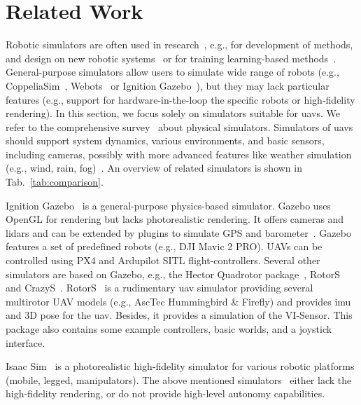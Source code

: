 \section{Related Work}
Robotic simulators are often used in research~\cite{collinsAReview2021}, e.g., for development of methods, and design on new robotic systems~\cite{kriegmanScalablePipelineDesigning2020} or for training learning-based methods~\cite{peng2017deeploco,miki2022learning}.
  General-purpose simulators allow users to simulate wide range of robots (e.g., CoppeliaSim~\cite{coppeliaSim}, Webots~\cite{Webots} or Ignition Gazebo~\cite{koenigDesignUseParadigms2004,gazeboNew}), but they may lack particular features (e.g., support for hardware-in-the-loop the specific robots or high-fidelity rendering).
  In this section, we focus solely on simulators suitable for \acp{uav}.
  We refer to the comprehensive survey~\cite{collinsAReview2021} about physical simulators.
  Simulators of \acp{uav} should support system dynamics, various environments, and basic sensors, including cameras, possibly with more advanced features like weather simulation (e.g., wind, rain, fog)~\cite{dimmig2024survey,Silano2023SurveySimulator}.
  An overview of related simulators is shown in Tab.~\ref{tab:comparison}.

  Ignition Gazebo~\cite{koenigDesignUseParadigms2004,gazeboNew} is a general-purpose physics-based simulator.
  Gazebo uses OpenGL for rendering but lacks photorealistic rendering.
  It offers cameras and \acp{lidar} and can be extended by plugins to simulate GPS and barometer~\cite{meyerComprehensiveSimulationQuadrotor2012}.
  Gazebo features a set of predefined robots (e.g., DJI Mavic 2 PRO).
  UAVs can be controlled using PX4 and Ardupilot SITL flight-controllers.
  Several other simulators are based on Gazebo,
  e.g., the Hector Quadrotor package~\cite{meyerComprehensiveSimulationQuadrotor2012}, RotorS~\cite{furrerRotorSModularGazebo2016}
  and CrazyS~\cite{silano2018crazys}.
  RotorS~\cite{furrerRotorSModularGazebo2016} is a rudimentary \ac{uav} simulator  
  providing several multirotor UAV models (e.g., AscTec Hummingbird \& Firefly) and  
  provides \ac{imu} and 3D pose for the \ac{uav}.
  Besides, it provides a simulation of the VI-Sensor. 
  This package also contains some example controllers, basic worlds, and a joystick interface. 

  Isaac Sim~\cite{isaacsim} is a photorealistic high-fidelity simulator for various robotic platforms (mobile, legged, manipulators).
  The above mentioned simulators~\cite{koenigDesignUseParadigms2004,gazeboNew,meyerComprehensiveSimulationQuadrotor2012,furrerRotorSModularGazebo2016,silano2018crazys,isaacsim} either lack the high-fidelity rendering, or do not provide high-level autonomy capabilities.

